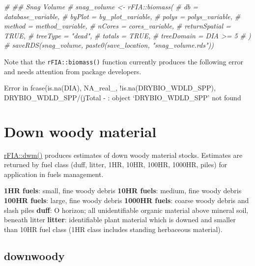 \documentclass[
]{book}
\newenvironment{Shaded}{\begin{snugshade}}{\end{snugshade}}
\newcommand{\CommentTok}[1]{\textcolor[rgb]{0.56,0.35,0.01}{\textit{#1}}}
\begin{document}
\begin{Shaded}
\begin{Highlighting}[]
\CommentTok{\# \#\# Snag Volume }
\CommentTok{\# snag\_volume \textless{}{-} rFIA::biomass(}
\CommentTok{\#   db = database\_variable,}
\CommentTok{\#   byPlot = by\_plot\_variable,}
\CommentTok{\#   polys = polys\_variable,}
\CommentTok{\#   method = method\_variable,}
\CommentTok{\#   nCores = cores\_variable,}
\CommentTok{\#   returnSpatial = TRUE,}
\CommentTok{\#   treeType = "dead",}
\CommentTok{\#   totals = TRUE,}
\CommentTok{\#   treeDomain = DIA \textgreater{}= 5 }
\CommentTok{\# )}
\CommentTok{\# saveRDS(snag\_volume, paste0(save\_location, "snag\_volume.rds"))}
\end{Highlighting}
\end{Shaded}

Note that the \texttt{rFIA::biomass()} function currently produces the following error and needs attention from package developers.

Error in fcase(is.na(DIA), NA\_real\_, !is.na(DRYBIO\_WDLD\_SPP), DRYBIO\_WDLD\_SPP/(jTotal - : object `DRYBIO\_WDLD\_SPP' not found

\hypertarget{down-woody-material}{%
\section{Down woody material}\label{down-woody-material}}

\href{https://rdrr.io/cran/rFIA/man/dwm.html}{rFIA::dwm()} produces estimates of down woody material stocks. Estimates are returned by fuel class (duff, litter, 1HR, 10HR, 100HR, 1000HR, piles) for application in fuels management.

\textbf{1HR fuels}: small, fine woody debris \textbf{10HR fuels}: medium, fine woody debris \textbf{100HR fuels}: large, fine woody debris \textbf{1000HR fuels}: coarse woody debris and slash piles \textbf{duff}: O horizon; all unidentifiable organic material above mineral soil, beneath litter \textbf{litter}: identifiable plant material which is downed and smaller than 10HR fuel class (1HR class includes standing herbaceous material).

\hypertarget{downwoody}{%
\subsection{downwoody}\label{downwoody}}
\end{document}

